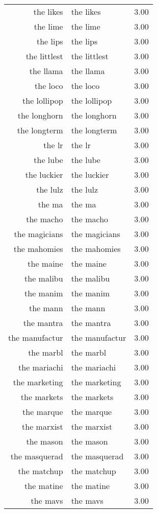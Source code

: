 \begin{table}[ht]
\begin{tabular}{rlr}
  the likes & the likes & 3.00 \\ 
  the lime & the lime & 3.00 \\ 
  the lips & the lips & 3.00 \\ 
  the littlest & the littlest & 3.00 \\ 
  the llama & the llama & 3.00 \\ 
  the loco & the loco & 3.00 \\ 
  the lollipop & the lollipop & 3.00 \\ 
  the longhorn & the longhorn & 3.00 \\ 
  the longterm & the longterm & 3.00 \\ 
  the lr & the lr & 3.00 \\ 
  the lube & the lube & 3.00 \\ 
  the luckier & the luckier & 3.00 \\ 
  the lulz & the lulz & 3.00 \\ 
  the ma & the ma & 3.00 \\ 
  the macho & the macho & 3.00 \\ 
  the magicians & the magicians & 3.00 \\ 
  the mahomies & the mahomies & 3.00 \\ 
  the maine & the maine & 3.00 \\ 
  the malibu & the malibu & 3.00 \\ 
  the manim & the manim & 3.00 \\ 
  the mann & the mann & 3.00 \\ 
  the mantra & the mantra & 3.00 \\ 
  the manufactur & the manufactur & 3.00 \\ 
  the marbl & the marbl & 3.00 \\ 
  the mariachi & the mariachi & 3.00 \\ 
  the marketing & the marketing & 3.00 \\ 
  the markets & the markets & 3.00 \\ 
  the marque & the marque & 3.00 \\ 
  the marxist & the marxist & 3.00 \\ 
  the mason & the mason & 3.00 \\ 
  the masquerad & the masquerad & 3.00 \\ 
  the matchup & the matchup & 3.00 \\ 
  the matine & the matine & 3.00 \\ 
  the mavs & the mavs & 3.00 \\ 

\end{tabular}
\end{table}
